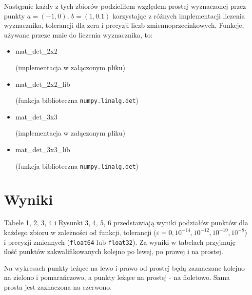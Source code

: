 \documentclass[11pt,a4paper]{article}
\begin{document}
Następnie każdy z tych zbiorów podzieliłem względem prostej wyznaczonej
przez punkty $a = (-1, 0)$, $b = (1, 0.1)$ korzystając z różnych 
implementacji liczenia wyznacznika, tolerancji dla zera i precyzji
liczb zmiennoprzecinkowych. Funkcje, używane przeze mnie do liczenia 
wyznacznika, to:
\begin{multicols}{2}
\begin{itemize}
    \item \begin{verbatim*}mat_det_2x2\end{verbatim*}
    (implementacja w załączonym pliku)
    \item \begin{verbatim*}mat_det_2x2_lib\end{verbatim*}
    (funkcja biblioteczna \verb|numpy.linalg.det|)
    \item \begin{verbatim*}mat_det_3x3\end{verbatim*}
    (implementacja w załączonym pliku)
    \item \begin{verbatim*}mat_det_3x3_lib\end{verbatim*}
    (funkcja biblioteczna \verb|numpy.linalg.det|)
\end{itemize}
\end{multicols}
\section{Wyniki}
Tabele 1, 2, 3, 4 i Rysunki 3, 4, 5, 6 przedstawiają wyniki podziałów punktów
dla każdego zbioru w zależności od funkcji, tolerancji 
($\varepsilon = 0, 10^{-14}, 10^{-12}, 10^{-10}, 10^{-8}$) 
i precyzji zmiennych (\verb|float64| lub \verb|float32|).
Za wyniki w tabelach przyjmuję ilość punktów zakwalifikowanych
kolejno po lewej, po prawej i na prostej.

Na wykresach punkty leżące na lewo i prawo
od prostej będą zaznaczane kolejno na zielono i pomarańczowo,
a punkty leżące na prostej - na fioletowo. Sama prosta jest zaznaczona
na czerwono.
\end{document}
